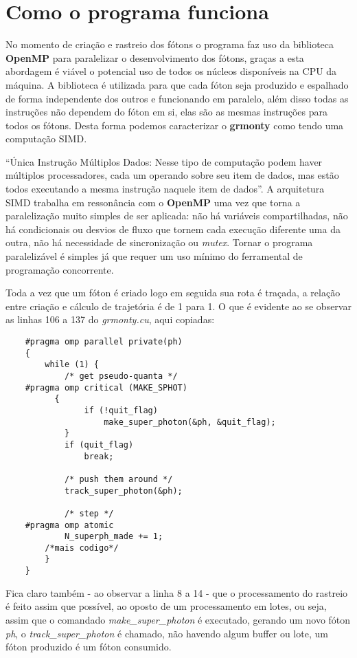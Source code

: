 \section{Como o programa funciona}
\label{sec:comofaz}

  No momento de criação e rastreio dos fótons o programa faz uso da biblioteca \textbf{OpenMP} para paralelizar o desenvolvimento dos fótons, graças a esta abordagem é viável o potencial uso de todos os núcleos disponíveis na CPU da máquina. A biblioteca é utilizada para que cada fóton seja produzido e espalhado de forma independente dos outros e funcionando em paralelo, além disso todas as instruções não dependem do fóton em si, elas são as mesmas instruções para todos os fótons. Desta forma podemos caracterizar o \textbf{grmonty} como tendo uma computação SIMD.

  ``Única Instrução Múltiplos Dados: Nesse tipo de computação podem haver múltiplos processadores, cada um operando sobre seu item de dados, mas estão todos executando a mesma instrução naquele item de dados''\citep[p.84, traduzido]{HCP:16}. A arquitetura SIMD trabalha em ressonância com o \textbf{OpenMP} uma vez que torna a paralelização muito simples de ser aplicada: não há variáveis compartilhadas, não há condicionais ou desvios de fluxo que tornem cada execução diferente uma da outra, não há necessidade de sincronização ou \textit{mutex}. Tornar o programa paralelizável é simples já que requer um uso mínimo do ferramental de programação concorrente.


  Toda a vez que um fóton é criado logo em seguida sua rota é traçada, a relação entre criação e cálculo de trajetória é de 1 para 1. O que é evidente ao se observar as linhas 106 a 137 do \textit{grmonty.cu}, aqui copiadas:

  \label{sec:main_loop}
  \begin{lstlisting}
    #pragma omp parallel private(ph)
  	{
  		while (1) {
  			/* get pseudo-quanta */
    #pragma omp critical (MAKE_SPHOT)
  		  {
  				if (!quit_flag)
  					make_super_photon(&ph, &quit_flag);
  			}
  			if (quit_flag)
  				break;

  			/* push them around */
  			track_super_photon(&ph);

  			/* step */
    #pragma omp atomic
  			N_superph_made += 1;
        /*mais codigo*/
  		}
  	}
  \end{lstlisting}

  Fica claro também - ao observar a linha 8 a 14 - que o processamento do rastreio é feito assim que possível, ao oposto de um processamento em lotes, ou seja, assim que o comandado \textit{make\_super\_photon} é executado, gerando um novo fóton \textit{ph}, o  \textit{track\_super\_photon} é chamado, não havendo algum buffer ou lote, um fóton produzido é um fóton consumido.

